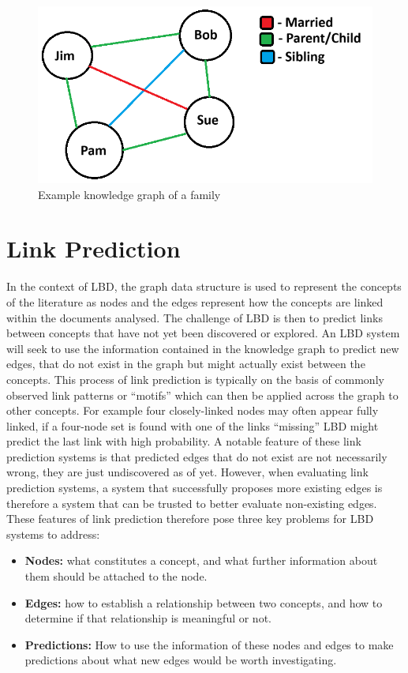 \documentclass{l4proj}
\begin{document}
\begin{figure}[h]
    \centering
    \includegraphics[width=0.6\linewidth]{images/knowledge_graph.png}
    \caption{Example knowledge graph of a family}
    \label{fig:knowledge_graph}
\end{figure}

\section{Link Prediction}

In the context of LBD, the graph data structure is used to represent the concepts of the literature as nodes and the edges represent how the concepts are linked within the documents analysed. The challenge of LBD is then to predict links between concepts that have not yet been discovered or explored. An LBD system will seek to use the information contained in the knowledge graph to predict new edges, that do not exist in the graph but might actually exist between the concepts. This process of link prediction is typically on the basis of commonly observed link patterns or ``motifs'' which can then be applied across the graph to other concepts. For example four closely-linked nodes may often appear fully linked, if a four-node set is found with one of the links ``missing'' LBD might predict the last link with high probability. A notable feature of these link prediction systems is that predicted edges that do not exist are not necessarily wrong, they are just undiscovered as of yet. However, when evaluating link prediction systems, a system that successfully proposes more existing edges is therefore a system that can be trusted to better evaluate non-existing edges. These features of link prediction therefore pose three key problems for LBD systems to address: \\

\begin{itemize}
    \item \textbf{Nodes:} what constitutes a concept, and what further information about them should be attached to the node.
    \item \textbf{Edges:} how to establish a relationship between two concepts, and how to determine if that relationship is meaningful or not.
    \item \textbf{Predictions:} How to use the information of these nodes and edges to make predictions about what new edges would be worth investigating. \\
\end{itemize}
\end{document}
